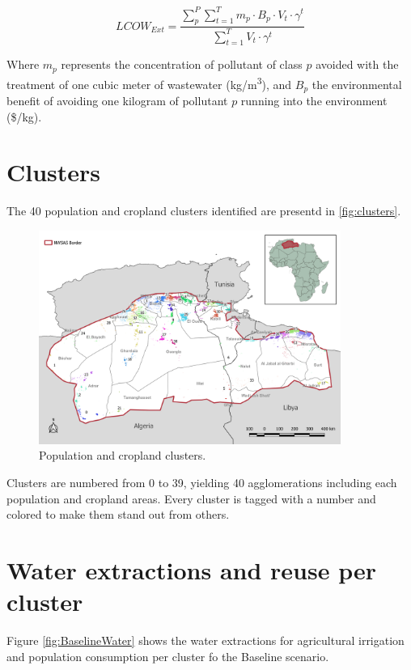 \documentclass[12pt]{iopart}
\begin{document}
\begin{equation}\label{eq:lcow_ext}
LCOW_{Ext} = \frac{\sum_{p}^{P}\sum_{t=1}^{T} m_{p}\cdot B_p\cdot V_{t}\cdot\gamma^{t}}{\sum_{t=1}^{T} V_{t}\cdot\gamma^{t}}
\end{equation}

Where $m_p$ represents the concentration of pollutant of class $p$ avoided with the treatment of one cubic meter of wastewater (kg/m\textsuperscript{3}), and $B_p$ the environmental benefit of avoiding one kilogram of pollutant $p$ running into the environment (\$/kg).

\section{Clusters}
The 40 population and cropland clusters identified are presentd in \autoref{fig:clusters}. 

\begin{figure}[!h]
	\centering
	\includegraphics[width=0.88\textwidth, cfbox=black 1pt 0pt]{NWSAS_clusters}
	\caption{Population and cropland clusters.}
	\label{fig:clusters}
\end{figure} 

Clusters are numbered from 0 to 39, yielding 40 agglomerations including each population and cropland areas. Every cluster is tagged with a number and colored to make them stand out from others.


\section{Water extractions and reuse per cluster}
Figure \autoref{fig:BaselineWater} shows the water extractions for agricultural irrigation and population consumption per cluster fo the Baseline scenario. 
\end{document}

